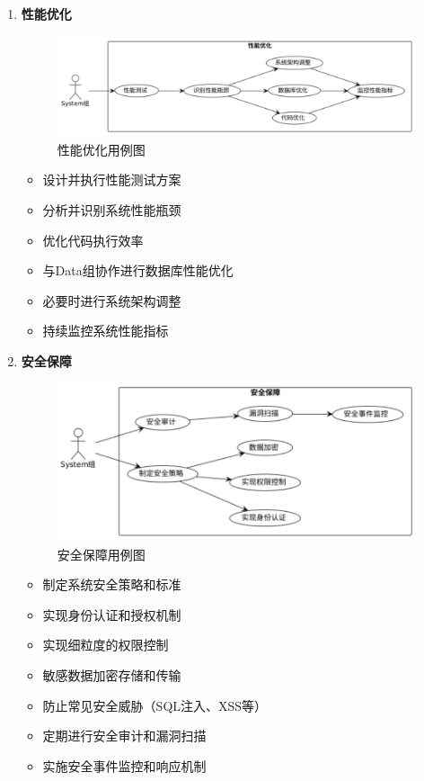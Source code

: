 \documentclass[a4paper,12pt]{article}
\begin{document}
\begin{enumerate}
  \item \textbf{性能优化}
  
  \begin{figure}[H]
    \centering
    \includegraphics[width=0.75\linewidth]{assets/image5.png}
    \caption{性能优化用例图}
    \label{fig:performance-optimization}
  \end{figure}
  
  \begin{itemize}
    \item 设计并执行性能测试方案
    \item 分析并识别系统性能瓶颈
    \item 优化代码执行效率
    \item 与Data组协作进行数据库性能优化
    \item 必要时进行系统架构调整
    \item 持续监控系统性能指标
  \end{itemize}
  
  \item \textbf{安全保障}
  
  \begin{figure}[H]
    \centering
    \includegraphics[width=0.75\linewidth]{assets/image6.png}
    \caption{安全保障用例图}
    \label{fig:security-protection}
  \end{figure}
  
  \begin{itemize}
    \item 制定系统安全策略和标准
    \item 实现身份认证和授权机制
    \item 实现细粒度的权限控制
    \item 敏感数据加密存储和传输
    \item 防止常见安全威胁（SQL注入、XSS等）
    \item 定期进行安全审计和漏洞扫描
    \item 实施安全事件监控和响应机制
  \end{itemize}
  

\end{enumerate}
\end{document}
